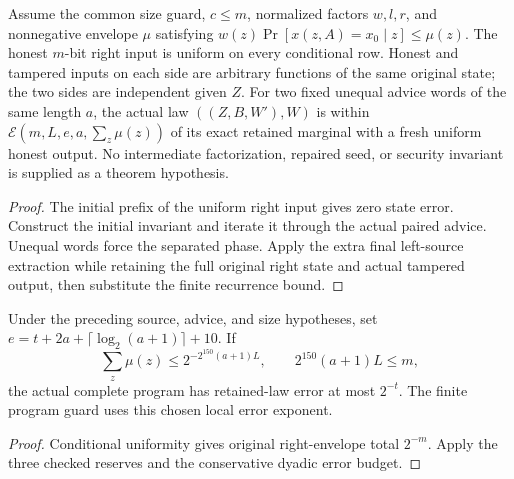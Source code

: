 \begin{theorem}
  \label{thm:lowerbounds-algebraic-advice-extraction}
  \leanok
  Assume the common size guard, $c\le m$, normalized factors $w,l,r$,
  and nonnegative envelope $\mu$ satisfying
  $w(z)\Pr[x(z,A)=x_0\mid z]\le\mu(z)$.
  The honest $m$-bit right input is uniform on every conditional row.
  Honest and tampered inputs on each side are arbitrary functions of
  the same original state; the two sides are independent given $Z$.
  For two fixed unequal advice words of the same length $a$, the actual
  law $((Z,B,W'),W)$ is within
  $\mathcal E(m,L,e,a,\sum_z\mu(z))$ of its exact retained marginal
  with a fresh uniform honest output.
  No intermediate factorization, repaired seed, or security invariant is
  supplied as a theorem hypothesis.
\end{theorem}
\begin{proof}
  \leanok
  The initial prefix of the uniform right input gives zero state error.
  Construct the initial invariant and iterate it through the actual paired
  advice. Unequal words force the separated phase. Apply the extra final
  left-source extraction while retaining the full original right state
  and actual tampered output, then substitute the finite recurrence bound.
\end{proof}

\begin{corollary}
  \label{cor:lowerbounds-algebraic-advice-extraction-dyadic}
  \leanok
  Under the preceding source, advice, and size hypotheses, set
  $e=t+2a+\lceil\log_2(a+1)\rceil+10$. If
  \[
    \sum_z\mu(z)\le2^{-2^{150}(a+1)L},\qquad
    2^{150}(a+1)L\le m,
  \]
  the actual complete program has retained-law error at most $2^{-t}$.
  The finite program guard uses this chosen local error exponent.
\end{corollary}
\begin{proof}
  \leanok
  Conditional uniformity gives original right-envelope total $2^{-m}$.
  Apply the three checked reserves and the conservative dyadic error budget.
\end{proof}


